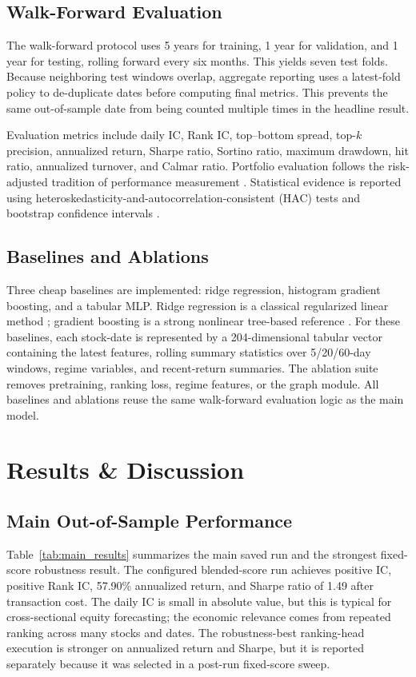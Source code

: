 \documentclass[conference]{IEEEtran}
\begin{document}
\subsection{Walk-Forward Evaluation}
The walk-forward protocol uses 5 years for training, 1 year for validation, and 1 year for testing, rolling forward every six months. This yields seven test folds. Because neighboring test windows overlap, aggregate reporting uses a latest-fold policy to de-duplicate dates before computing final metrics. This prevents the same out-of-sample date from being counted multiple times in the headline result.

Evaluation metrics include daily IC, Rank IC, top--bottom spread, top-$k$ precision, annualized return, Sharpe ratio, Sortino ratio, maximum drawdown, hit ratio, annualized turnover, and Calmar ratio. Portfolio evaluation follows the risk-adjusted tradition of performance measurement \cite{sharpe1966mutual}. Statistical evidence is reported using heteroskedasticity-and-autocorrelation-consistent (HAC) tests and bootstrap confidence intervals \cite{neweywest1987simple,efron1993introduction}.

\subsection{Baselines and Ablations}
Three cheap baselines are implemented: ridge regression, histogram gradient boosting, and a tabular MLP. Ridge regression is a classical regularized linear method \cite{hoerl1970ridge}; gradient boosting is a strong nonlinear tree-based reference \cite{friedman2001greedy}. For these baselines, each stock-date is represented by a 204-dimensional tabular vector containing the latest features, rolling summary statistics over 5/20/60-day windows, regime variables, and recent-return summaries. The ablation suite removes pretraining, ranking loss, regime features, or the graph module. All baselines and ablations reuse the same walk-forward evaluation logic as the main model.

\section{Results \& Discussion}
\subsection{Main Out-of-Sample Performance}
Table~\ref{tab:main_results} summarizes the main saved run and the strongest fixed-score robustness result. The configured blended-score run achieves positive IC, positive Rank IC, 57.90\% annualized return, and Sharpe ratio of 1.49 after transaction cost. The daily IC is small in absolute value, but this is typical for cross-sectional equity forecasting; the economic relevance comes from repeated ranking across many stocks and dates. The robustness-best ranking-head execution is stronger on annualized return and Sharpe, but it is reported separately because it was selected in a post-run fixed-score sweep.
\end{document}
